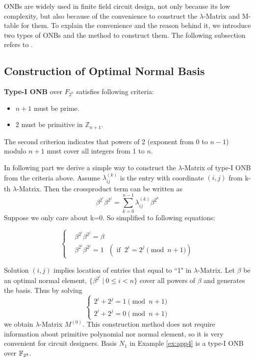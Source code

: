 ONBs are widely used in finite field circuit design, not only because its low complexity, 
but also because of the convenience to construct the $\lambda$-Matrix and M-table for them. 
To explain the convenience and the reason behind it, we introduce two types of ONBs and the method 
to construct them.
The following subsection refers to \cite{rosingbook}.
\subsection{Construction of Optimal Normal Basis}
{\bf Type-I ONB} over $F_{2^n}$ satisfies following criteria:
\begin{itemize}
\item $n+1$ must be prime.
\item 2 must be primitive in $\mathbb{Z}_{n+1}$.
\end{itemize}
The second criterion indicates that powers of 2 (exponent from 0 to $n-1$) modulo $n+1$ must cover all integers
from 1 to $n$.

In following part we derive a simple way to construct the $\lambda$-Matrix of type-I ONB 
from the criteria above. 
Assume $\lambda_{ij}^{(k)}$ is the entry with coordinate $(i,j)$ from k-th $\lambda$-Matrix. Then the crossproduct
term can be written as
\begin{equation}
\beta^{2^i}\beta^{2^j} = \sum_{k=0}^{n-1} \lambda_{ij}^{(k)} \beta^{2^k}
\end{equation}
Suppose we only care about k=0. So simplified to following equations:

$$
\begin{cases}
&\beta^{2^i}\beta^{2^j} = \beta\\
&\beta^{2^i}\beta^{2^j} = 1 ~~~(\text{ if }~  2^i = 2^j\pmod{n+1})
\end{cases}$$

Solution $(i,j)$ implies location of entries that equal to ``1" in $\lambda$-Matrix. 
Let $\beta$ be an optimal normal element, 
$\{\beta^{2^i}~|~0\leq i<n\}$ cover all powers of $\beta$ and generates the basis. Thus by solving
$$\begin{cases}
2^i + 2^j = 1 \pmod{n+1}\\
2^i + 2^j = 0 \pmod{n+1}
\end{cases}$$
we obtain $\lambda$-Matrix $M^{(0)}$. This construction method does not require information about 
primitive polynomial nor normal element, so it is very convenient for circuit designers.
Basis $N_1$ in Example \ref{ex:app4} is a type-I ONB over ${\mathbb{F}}_{2^4}$.

